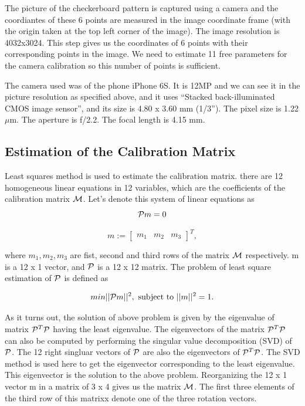 \documentclass{article}
\begin{document}
\medskip
The picture of the checkerboard pattern is captured using a camera and the coordiantes of these 6 points are measured in the image coordinate frame (with the origin taken at the top left corner of the image). The image resolution is 4032x3024. This step gives us the coordinates of 6 points with their corresponding points in the image. We need to estimate 11 free parameters for the camera calibration so this number of points is sufficient.

\medskip
The camera used was of the phone iPhone 6S. It is 12MP and we can see it in the picture resolution as specified above, and it uses ``Stacked back-illuminated CMOS image sensor'', and its size is 4.80 x 3.60 mm (1/3''). The pixel size is 1.22 $\mu$m. The aperture is f/2.2. The focal length is 4.15 mm. 

\subsection{Estimation of the Calibration Matrix}
Least squares method is used to estimate the calibration matrix. there are 12 homogeneous linear equations in 12 variables, which are the coefficients of the calibration matrix $\CMcal{M}$. Let's denote this system of linear equations as 
\begin{equation}
\CMcal{P}m = 0
\end{equation}

\begin{equation}
m:=\begin{bmatrix} m_1 & m_2 & m_3 \end{bmatrix}^T,
\end{equation}

\medskip
where $m_1, m_2, m_3$ are fist, second and third rows of the matrix $\CMcal{M}$ respectively. m is a 12 x 1 vector, and $\CMcal{P}$ is a 12 x 12 matrix. The problem of least square estimation of $\CMcal{P}$ is defined as

\begin{equation}
min|| \CMcal{P}m ||^2,  \text{ subject to }||m||^2=1.
\end{equation}

\medskip

As it turns out, the solution of above problem is given by the eigenvalue of matrix $\CMcal{P}^T\CMcal{P}$ having the least eigenvalue. The eigenvectors of the matrix $\CMcal{P}^T\CMcal{P}$ can also be computed by performing the singular value decomposition (SVD) of $\CMcal{P}$. The 12 right singluar vectors of $\CMcal{P}$ are also the eigenvectors of $\CMcal{P}^T\CMcal{P}$. The SVD method is used here to get the eigenvector corresponding to the least eigenvalue. This eigenvector is the solution to the above problem. Reorganizing the 12 x 1 vector m in a matrix of 3 x 4 gives us the matrix $\CMcal{M}$. The first three elements of the third row of this matrixx denote one of the three rotation vectors.
\end{document}
